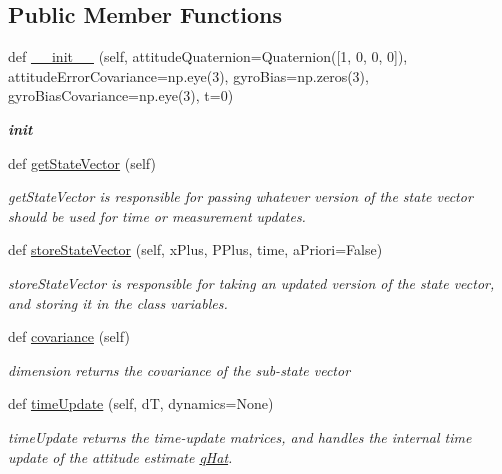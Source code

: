 \subsection*{Public Member Functions}
\begin{DoxyCompactItemize}
\item 
def \hyperlink{classAttitudeSubstate_1_1AttitudeState6DOF_a337e9fa07d0211f86b359e5d9deee1b8}{\+\_\+\+\_\+init\+\_\+\+\_\+} (self, attitude\+Quaternion=Quaternion(\mbox{[}1, 0, 0, 0\mbox{]}), attitude\+Error\+Covariance=np.\+eye(3), gyro\+Bias=np.\+zeros(3), gyro\+Bias\+Covariance=np.\+eye(3), t=0)
\begin{DoxyCompactList}\small\item\em {\bfseries init} \end{DoxyCompactList}\item 
def \hyperlink{classAttitudeSubstate_1_1AttitudeState6DOF_a8e420e4a7806669c1286a1a70ce019da}{get\+State\+Vector} (self)
\begin{DoxyCompactList}\small\item\em get\+State\+Vector is responsible for passing whatever version of the state vector should be used for time or measurement updates. \end{DoxyCompactList}\item 
def \hyperlink{classAttitudeSubstate_1_1AttitudeState6DOF_aad1116f42d28a7f8b72a621f31a2fc19}{store\+State\+Vector} (self, x\+Plus, P\+Plus, time, a\+Priori=False)
\begin{DoxyCompactList}\small\item\em store\+State\+Vector is responsible for taking an updated version of the state vector, and storing it in the class variables. \end{DoxyCompactList}\item 
def \hyperlink{classAttitudeSubstate_1_1AttitudeState6DOF_a44691ece9ee2a36d3c11f12e72004e41}{covariance} (self)
\begin{DoxyCompactList}\small\item\em dimension returns the covariance of the sub-\/state vector \end{DoxyCompactList}\item 
def \hyperlink{classAttitudeSubstate_1_1AttitudeState6DOF_a9b27c2b6d9e51256918edd8505df0bd7}{time\+Update} (self, dT, dynamics=None)
\begin{DoxyCompactList}\small\item\em time\+Update returns the time-\/update matrices, and handles the internal time update of the attitude estimate \hyperlink{classAttitudeSubstate_1_1AttitudeState6DOF_a36a58a47280151dd544762d9a1d5c35d}{q\+Hat}. \end{DoxyCompactList}\item 

\end{DoxyCompactItemize}
